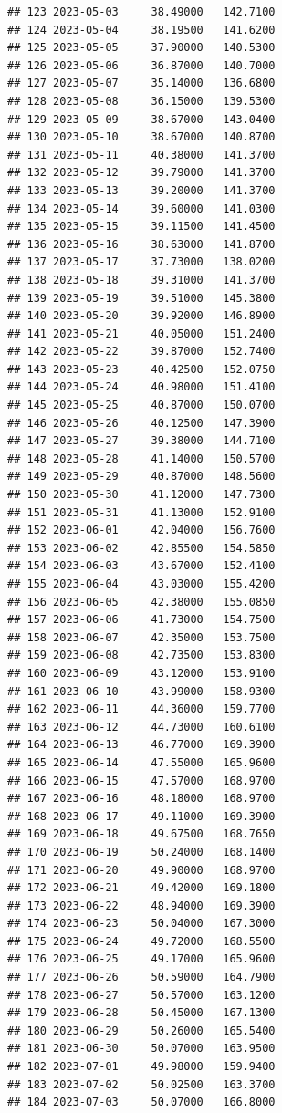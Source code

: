 \documentclass[
]{article}
\begin{document}
\begin{verbatim}
## 123 2023-05-03     38.49000   142.7100
## 124 2023-05-04     38.19500   141.6200
## 125 2023-05-05     37.90000   140.5300
## 126 2023-05-06     36.87000   140.7000
## 127 2023-05-07     35.14000   136.6800
## 128 2023-05-08     36.15000   139.5300
## 129 2023-05-09     38.67000   143.0400
## 130 2023-05-10     38.67000   140.8700
## 131 2023-05-11     40.38000   141.3700
## 132 2023-05-12     39.79000   141.3700
## 133 2023-05-13     39.20000   141.3700
## 134 2023-05-14     39.60000   141.0300
## 135 2023-05-15     39.11500   141.4500
## 136 2023-05-16     38.63000   141.8700
## 137 2023-05-17     37.73000   138.0200
## 138 2023-05-18     39.31000   141.3700
## 139 2023-05-19     39.51000   145.3800
## 140 2023-05-20     39.92000   146.8900
## 141 2023-05-21     40.05000   151.2400
## 142 2023-05-22     39.87000   152.7400
## 143 2023-05-23     40.42500   152.0750
## 144 2023-05-24     40.98000   151.4100
## 145 2023-05-25     40.87000   150.0700
## 146 2023-05-26     40.12500   147.3900
## 147 2023-05-27     39.38000   144.7100
## 148 2023-05-28     41.14000   150.5700
## 149 2023-05-29     40.87000   148.5600
## 150 2023-05-30     41.12000   147.7300
## 151 2023-05-31     41.13000   152.9100
## 152 2023-06-01     42.04000   156.7600
## 153 2023-06-02     42.85500   154.5850
## 154 2023-06-03     43.67000   152.4100
## 155 2023-06-04     43.03000   155.4200
## 156 2023-06-05     42.38000   155.0850
## 157 2023-06-06     41.73000   154.7500
## 158 2023-06-07     42.35000   153.7500
## 159 2023-06-08     42.73500   153.8300
## 160 2023-06-09     43.12000   153.9100
## 161 2023-06-10     43.99000   158.9300
## 162 2023-06-11     44.36000   159.7700
## 163 2023-06-12     44.73000   160.6100
## 164 2023-06-13     46.77000   169.3900
## 165 2023-06-14     47.55000   165.9600
## 166 2023-06-15     47.57000   168.9700
## 167 2023-06-16     48.18000   168.9700
## 168 2023-06-17     49.11000   169.3900
## 169 2023-06-18     49.67500   168.7650
## 170 2023-06-19     50.24000   168.1400
## 171 2023-06-20     49.90000   168.9700
## 172 2023-06-21     49.42000   169.1800
## 173 2023-06-22     48.94000   169.3900
## 174 2023-06-23     50.04000   167.3000
## 175 2023-06-24     49.72000   168.5500
## 176 2023-06-25     49.17000   165.9600
## 177 2023-06-26     50.59000   164.7900
## 178 2023-06-27     50.57000   163.1200
## 179 2023-06-28     50.45000   167.1300
## 180 2023-06-29     50.26000   165.5400
## 181 2023-06-30     50.07000   163.9500
## 182 2023-07-01     49.98000   159.9400
## 183 2023-07-02     50.02500   163.3700
## 184 2023-07-03     50.07000   166.8000

\end{verbatim}
\end{document}

